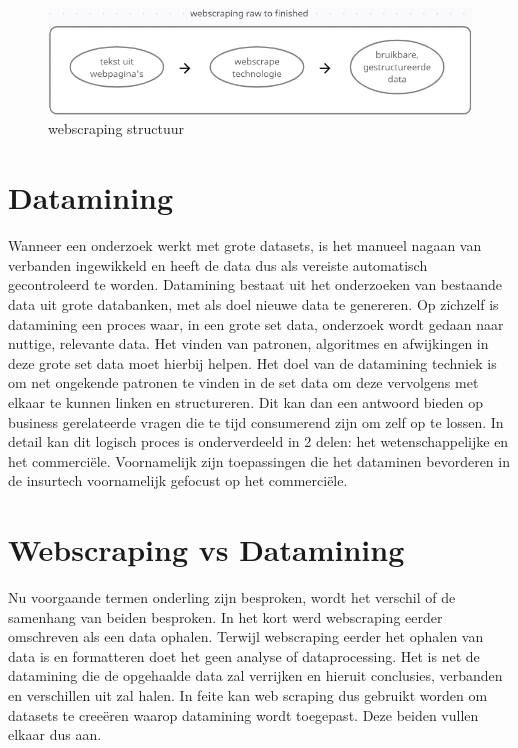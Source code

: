 \begin{figure}[bH]
	\centering
	\includegraphics{webscraping_cycle}
	\caption{webscraping structuur}
\end{figure}


\section{Datamining}

Wanneer een onderzoek werkt met grote datasets, is het manueel nagaan van verbanden ingewikkeld en heeft de data dus als vereiste automatisch gecontroleerd te worden.
Datamining bestaat uit het onderzoeken van bestaande data uit grote databanken, met als doel nieuwe data te genereren.
Op zichzelf is datamining een proces waar, in een grote set data, onderzoek wordt gedaan naar nuttige, relevante data. Het vinden van patronen, algoritmes en afwijkingen in deze grote set data moet hierbij helpen. Het doel van de datamining techniek is om net ongekende patronen te vinden in de set data om deze vervolgens met elkaar te kunnen linken en structureren. Dit kan dan een antwoord bieden op business gerelateerde vragen die te tijd consumerend zijn om zelf op te lossen. \autocite{osman2019data} In detail kan dit logisch proces is onderverdeeld in 2 delen: het wetenschappelijke en het commerciële. Voornamelijk zijn toepassingen die het dataminen bevorderen in de insurtech voornamelijk gefocust op het commerciële. \autocite{hand2007principles}

\section{Webscraping vs Datamining}

Nu voorgaande termen onderling zijn besproken, wordt het verschil of de samenhang van beiden besproken. In het kort werd webscraping eerder omschreven als een data ophalen.  Terwijl webscraping eerder het ophalen van data is en formatteren doet het geen analyse of dataprocessing. Het is net de datamining die de opgehaalde data zal verrijken en hieruit conclusies, verbanden en verschillen uit zal halen. In feite kan web scraping dus gebruikt worden om datasets te creeëren waarop datamining wordt toegepast. Deze beiden vullen elkaar dus aan.


